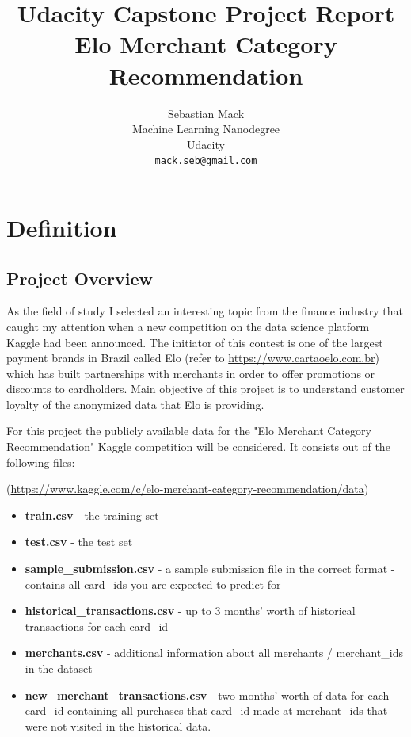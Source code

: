 \documentclass{article}
\title{Udacity Capstone Project Report \\ Elo Merchant Category Recommendation}
\author{
    Sebastian Mack\\
    Machine Learning Nanodegree\\
    Udacity\\
    \texttt{mack.seb@gmail.com} \\
}
\begin{document}
\maketitle

\newpage

\tableofcontents
\newpage

\listoffigures
\newpage

\section{Definition}

\subsection{Project Overview}



As the field of study I selected an interesting topic from the finance industry that caught my attention when a new competition on the data science platform Kaggle had been announced. The initiator of this contest is one of the largest payment brands in Brazil called Elo (refer to \url{https://www.cartaoelo.com.br}) which has built partnerships with merchants in order to offer promotions or discounts to cardholders. Main objective of this project is to understand customer loyalty of the anonymized data that Elo is providing. 

For this project the publicly available data for the "Elo Merchant Category Recommendation" Kaggle competition will be considered. It consists out of the following files:

(\url{https://www.kaggle.com/c/elo-merchant-category-recommendation/data})

\begin{itemize}
\item \textbf{train.csv} - the training set
\item \textbf{test.csv} - the test set 
\item \textbf{sample\_submission.csv} - a sample submission file in the correct format - contains all card\_ids you are expected to predict for
\item \textbf{historical\_transactions.csv} - up to 3 months' worth of historical transactions for each card\_id
\item \textbf{merchants.csv} - additional information about all merchants / merchant\_ids in the dataset
\item \textbf{new\_merchant\_transactions.csv} - two months' worth of data for each card\_id containing all purchases that card\_id made at merchant\_ids that were not visited in the historical data.
\end{itemize}
\end{document}
